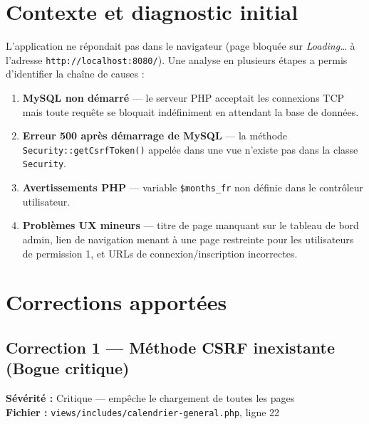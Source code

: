 \documentclass[12pt,a4paper]{article}
\begin{document}
\section{Contexte et diagnostic initial}

L'application ne répondait pas dans le navigateur (page bloquée sur
\textit{Loading\ldots} à l'adresse \texttt{http://localhost:8080/}).
Une analyse en plusieurs étapes a permis d'identifier la chaîne de causes :

\begin{enumerate}[leftmargin=2cm]
    \item \textbf{MySQL non démarré} — le serveur PHP acceptait les connexions
          TCP mais toute requête se bloquait indéfiniment en attendant la base
          de données.
    \item \textbf{Erreur 500 après démarrage de MySQL} — la méthode
          \texttt{Security::getCsrfToken()} appelée dans une vue n'existe pas
          dans la classe \texttt{Security}.
    \item \textbf{Avertissements PHP} — variable \texttt{\$months\_fr}
          non définie dans le contrôleur utilisateur.
    \item \textbf{Problèmes UX mineurs} — titre de page manquant sur le
          tableau de bord admin, lien de navigation menant à une page
          restreinte pour les utilisateurs de permission 1, et URLs de
          connexion/inscription incorrectes.
\end{enumerate}

\section{Corrections apportées}

\subsection{Correction 1 — Méthode CSRF inexistante (Bogue critique)}

\begin{mdframed}[backgroundcolor=danger!10, linecolor=danger, linewidth=1.5pt]
\textbf{Sévérité :} Critique — empêche le chargement de toutes les pages\\
\textbf{Fichier :} \texttt{views/includes/calendrier-general.php}, ligne 22
\end{mdframed}
\end{document}
